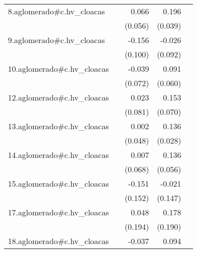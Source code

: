 {\begin{longtable}{l*{4}{D{.}{.}{-1}}}
\addlinespace
8.aglomerado#c.hv\_cloacas&                     &       0.066         &       0.196\sym{***}&                     \\
            &                     &     (0.056)         &     (0.039)         &                     \\
\addlinespace
9.aglomerado#c.hv\_cloacas&                     &      -0.156         &      -0.026         &                     \\
            &                     &     (0.100)         &     (0.092)         &                     \\
\addlinespace
10.aglomerado#c.hv\_cloacas&                     &      -0.039         &       0.091         &                     \\
            &                     &     (0.072)         &     (0.060)         &                     \\
\addlinespace
12.aglomerado#c.hv\_cloacas&                     &       0.023         &       0.153\sym{*}  &                     \\
            &                     &     (0.081)         &     (0.070)         &                     \\
\addlinespace
13.aglomerado#c.hv\_cloacas&                     &       0.002         &       0.136\sym{***}&                     \\
            &                     &     (0.048)         &     (0.028)         &                     \\
\addlinespace
14.aglomerado#c.hv\_cloacas&                     &       0.007         &       0.136\sym{*}  &                     \\
            &                     &     (0.068)         &     (0.056)         &                     \\
\addlinespace
15.aglomerado#c.hv\_cloacas&                     &      -0.151         &      -0.021         &                     \\
            &                     &     (0.152)         &     (0.147)         &                     \\
\addlinespace
17.aglomerado#c.hv\_cloacas&                     &       0.048         &       0.178         &                     \\
            &                     &     (0.194)         &     (0.190)         &                     \\
\addlinespace
18.aglomerado#c.hv\_cloacas&                     &      -0.037         &       0.094\sym{*}  &                     \\

\end{longtable}}
